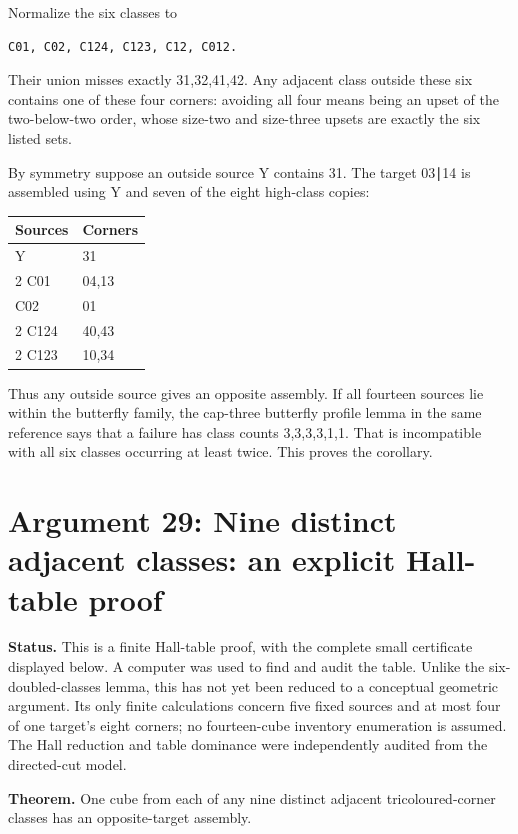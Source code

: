 \documentclass[
  10pt,
]{article}
\begin{document}
Normalize the six classes to

\begin{verbatim}
C01, C02, C124, C123, C12, C012.
\end{verbatim}

Their union misses exactly 31,32,41,42. Any adjacent class outside these
six contains one of these four corners: avoiding all four means being an
upset of the two-below-two order, whose size-two and size-three upsets
are exactly the six listed sets.

By symmetry suppose an outside source Y contains 31. The target 03∣14 is
assembled using Y and seven of the eight high-class copies:

\begin{longtable}[]{@{}ll@{}}
\toprule\noalign{}
Sources & Corners \\
\midrule\noalign{}
\endhead
\bottomrule\noalign{}
\endlastfoot
Y & 31 \\
2 C01 & 04,13 \\
C02 & 01 \\
2 C124 & 40,43 \\
2 C123 & 10,34 \\
\end{longtable}

Thus any outside source gives an opposite assembly. If all fourteen
sources lie within the butterfly family, the cap-three butterfly profile
lemma in the same reference says that a failure has class counts
3,3,3,3,1,1. That is incompatible with all six classes occurring at
least twice. This proves the corollary.

\hypertarget{arg-29}{%
\section{Argument 29: Nine distinct adjacent classes: an explicit
Hall-table proof}\label{arg-29}}

\textbf{Status.} This is a finite Hall-table proof, with the complete
small certificate displayed below. A computer was used to find and audit
the table. Unlike the six-doubled-classes lemma, this has not yet been
reduced to a conceptual geometric argument. Its only finite calculations
concern five fixed sources and at most four of one target's eight
corners; no fourteen-cube inventory enumeration is assumed. The Hall
reduction and table dominance were independently audited from the
directed-cut model.

\textbf{Theorem.} One cube from each of any nine distinct adjacent
tricoloured-corner classes has an opposite-target assembly.
\end{document}

